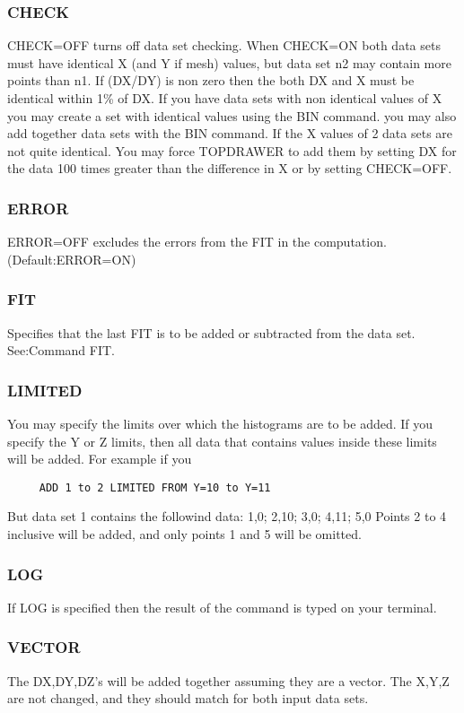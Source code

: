 \subsubsection{CHECK}
CHECK=OFF  turns  off  data set checking.  When CHECK=ON both data sets
must have identical X (and Y if mesh)  values,  but  data  set  n2  may
contain  more  points than n1.  If (DX/DY) is non zero then the both DX
and X must be identical within 1\% of DX.  If you have  data  sets  with
non  identical  values  of X you may create a set with identical values
using the BIN command.  you may also add together data  sets  with  the
BIN  command.   If the X values of 2 data sets are not quite identical.
You may force TOPDRAWER to add them by setting  DX  for  the  data  100
times greater than the difference in X or by setting CHECK=OFF.  
\subsubsection{ERROR}
ERROR=OFF excludes the errors from the FIT in the computation.  
(Default:ERROR=ON) 
\subsubsection{FIT}
Specifies  that the last FIT is to be added or subtracted from the data
set.  See:Command FIT.  
\subsubsection{LIMITED}
You  may  specify the limits over which the histograms are to be added.
If you specify the Y or Z limits, then all data  that  contains  values
inside these limits will be added.  For example if you 
\begin{verbatim}
     ADD 1 to 2 LIMITED FROM Y=10 to Y=11 
\end{verbatim}
But data set 1 contains the followind data:  
1,0;  2,10;  3,0;  4,11;  5,0 
Points  2 to 4 inclusive will be added, and only points 1 and 5 will be
omitted.  
\subsubsection{LOG}
If  LOG  is  specified  then the result of the command is typed on your
terminal.  
\subsubsection{VECTOR}
The  DX,DY,DZ's will be added together assuming they are a vector.  The
X,Y,Z are not changed, and they should match for both input data sets. 
